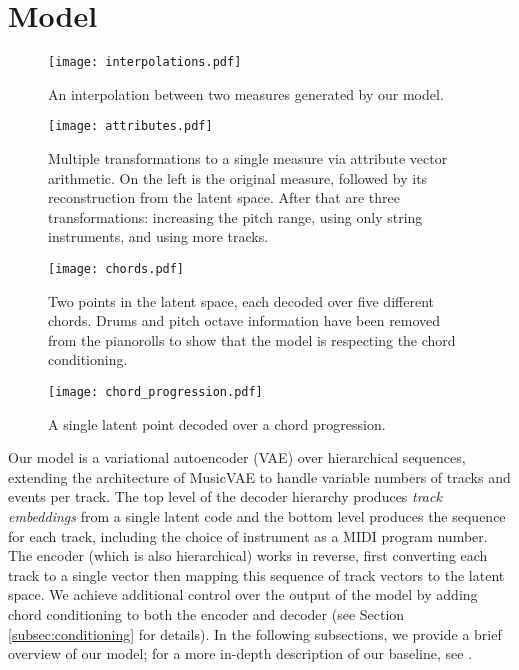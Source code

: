 \documentclass{article}
\begin{document}
\section{Model}

\begin{figure*}[t]
    \centering
    \texttt{[image: interpolations.pdf]}
    \caption{An interpolation between two measures generated by our model.}
    \label{fig:interpolations}
\end{figure*}

\begin{figure*}[t]
    \centering
    \texttt{[image: attributes.pdf]}
    \caption{Multiple transformations to a single measure via attribute vector arithmetic.  On the left is the original measure, followed by its reconstruction from the latent space.  After that are three transformations: increasing the pitch range, using only string instruments, and using more tracks.}
    \label{fig:attributes}
\end{figure*}

\begin{figure*}[t]
    \centering
    \texttt{[image: chords.pdf]}
    \caption{Two points in the latent space, each decoded over five different chords.  Drums and pitch octave information have been removed from the pianorolls to show that the model is respecting the chord conditioning.}
    \label{fig:chords}
\end{figure*}

\begin{figure*}[t]
    \centering
    \texttt{[image: chord\_progression.pdf]}
    \caption{A single latent point decoded over a chord progression.}
    \label{fig:chord_progression}
\end{figure*}

Our model is a variational autoencoder (VAE) \cite{kingma2014stochastic} over hierarchical sequences, extending the architecture of MusicVAE \cite{roberts2018hierarchical} to handle variable numbers of tracks and events per track.  The top level of the decoder hierarchy produces {\it track embeddings} from a single latent code and the bottom level produces the sequence for each track, including the choice of instrument as a MIDI program number. The encoder (which is also hierarchical) works in reverse, first converting each track to a single vector then mapping this sequence of track vectors to the latent space.  We achieve additional control over the output of the model by adding chord conditioning to both the encoder and decoder (see Section \ref{subsec:conditioning} for details).  In the following subsections, we provide a brief overview of our model; for a more in-depth description of our baseline, see \cite{roberts2018hierarchical}.
\end{document}
